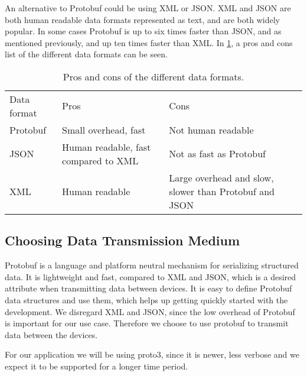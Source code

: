 An alternative to Protobuf could be using XML or JSON.
XML and JSON are both human readable data formats represented as text, and are both widely popular.
In some cases Protobuf is up to six times faster than JSON, and as mentioned previously, and up ten times faster than XML\cite{json_slow}.
In \cref{tab:format_pros_cons}, a pros and cons list of the different data formats can be seen.

\begin{table}
    \begin{tabularx}{\textwidth}{XXX}\toprule
        Data format & Pros                                          & Cons \\
        Protobuf    & Small overhead, fast                          & Not human readable \\
        JSON        & Human readable, \newline fast compared to XML & Not as fast as Protobuf\\
        XML         & Human readable                                & Large overhead and slow, slower than Protobuf and JSON \\
    \end{tabularx}
    \caption{Pros and cons of the different data formats.}\label{tab:format_pros_cons}
\end{table}

\subsection{Choosing Data Transmission Medium}
Protobuf is a language and platform neutral mechanism for serializing structured data.
It is lightweight and fast, compared to XML and JSON, which is a desired attribute when transmitting data between devices.
It is easy to define Protobuf data structures and use them, which helps up getting quickly started with the development.
We disregard XML and JSON, since the low overhead of Protobuf is important for our use case.
Therefore we choose to use protobuf to transmit data between the devices.

For our application we will be using proto3, since it is newer, less verbose and we expect it to be supported for a longer time period.
